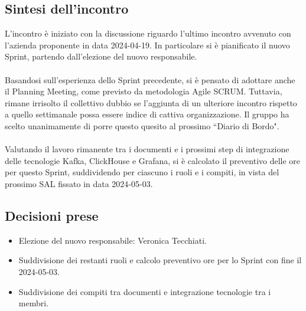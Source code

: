 \documentclass[8pt]{article}
\begin{document}
\subsection{Sintesi dell'incontro}
L'incontro è iniziato con la discussione riguardo l'ultimo incontro avvenuto con l'azienda proponente in data 2024-04-19. In particolare si è pianificato il nuovo Sprint, partendo dall'elezione del nuovo responsabile. \\~\\Basandosi sull'esperienza dello Sprint precedente, si è pensato di adottare anche il Planning Meeting, come previsto da metodologia Agile SCRUM. Tuttavia, rimane irrisolto il collettivo dubbio se l'aggiunta di un ulteriore incontro rispetto a quello settimanale possa essere indice di cattiva organizzazione. Il gruppo ha scelto unanimamente di porre questo quesito al prossimo ``Diario di Bordo". \\~\\Valutando il lavoro rimanente tra i documenti e i prossimi step di integrazione delle tecnologie Kafka, ClickHouse e Grafana, si è calcolato il preventivo delle ore per questo Sprint, suddividendo per ciascuno i ruoli e i compiti, in vista del prossimo SAL fissato in data 2024-05-03.
\subsection{Decisioni prese}
\begin{itemize}
	\setlength\itemsep{0em}
	\item Elezione del nuovo responsabile: Veronica Tecchiati.
	\item Suddivisione dei restanti ruoli e calcolo preventivo ore per lo Sprint con fine il 2024-05-03.
	\item Suddivisione dei compiti tra documenti e integrazione tecnologie tra i membri.
\end{itemize}
\newpage
\end{document}
